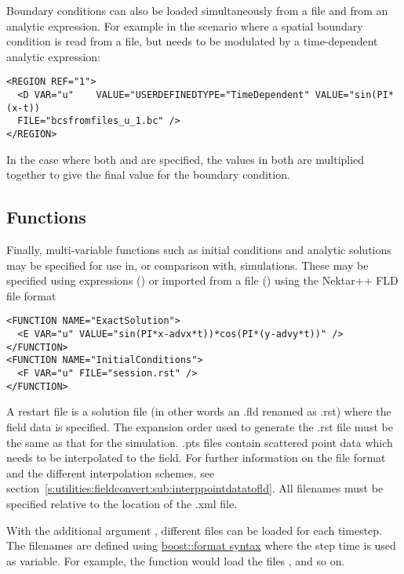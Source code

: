 Boundary conditions can also be loaded simultaneously from a file and from an analytic expression. For example in the scenario where a spatial boundary condition is read from a file, but needs to be modulated by a time-dependent analytic expression:
\begin{lstlisting}[style=XMLStyle]
<REGION REF="1">
  <D VAR="u"	VALUE="USERDEFINEDTYPE="TimeDependent" VALUE="sin(PI*(x-t)) 
  FILE="bcsfromfiles_u_1.bc" />
</REGION>
\end{lstlisting}

In the case where both  and  are specified, the values in both are multiplied together to give the final value for the boundary condition. 

\subsection{Functions}

Finally, multi-variable functions such as initial conditions and analytic
solutions may be specified for use in, or comparison with, simulations. These
may be specified using expressions () or imported from a file
() using the Nektar++ FLD file format

\begin{lstlisting}[style=XMLStyle]
<FUNCTION NAME="ExactSolution">
  <E VAR="u" VALUE="sin(PI*x-advx*t))*cos(PI*(y-advy*t))" />
</FUNCTION>
<FUNCTION NAME="InitialConditions">
  <F VAR="u" FILE="session.rst" />
</FUNCTION>
\end{lstlisting}

A restart file is a solution file (in other words an .fld renamed as .rst) where
the field data is specified. The expansion order used to generate the .rst file
must be the same as that for the simulation.
.pts files contain scattered point data which needs to be interpolated to the field.
For further information on the file format and the different interpolation schemes, see
section~\ref{s:utilities:fieldconvert:sub:interppointdatatofld}.
All filenames must be specified relative to the location of the .xml file.

With the additional argument , different files can be
loaded for each timestep. The filenames are defined using
\href{http://www.boost.org/doc/libs/1_56_0/libs/format/doc/format.html#syntax}{boost::format syntax}
where the step time is used as variable. For example, the function
 would load the files ,
 and so on.

